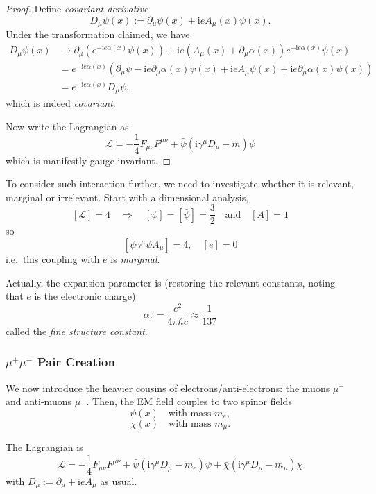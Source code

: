 \documentclass[a4paper,11pt]{article}
\begin{document}
	\begin{proof}
		Define \emph{covariant derivative}
		\[
			D_\mu \psi(x) := \partial_\mu \psi(x) + \mathrm{i} e A_\mu(x) \psi(x).
		\]
		Under the transformation claimed, we have
		\begin{align*}
			D_\mu \psi(x) &\to \partial_\mu \left( e ^{- \mathrm{i} e \alpha(x)} \psi(x) \right) + \mathrm{i} e \left( A_\mu(x) + \partial_\mu \alpha(x) \right) e ^{-\mathrm{i} e \alpha(x)} \psi(x)\\
			& = e ^{-\mathrm{i} e \alpha(x)}\left( \partial_\mu \psi - \mathrm{i} e \partial_\mu \alpha(x) \psi(x) + \mathrm{i} e A_\mu \psi(x) + \mathrm{i} e \partial_\mu \alpha(x)\psi(x) \right)\\
			& = e ^{-\mathrm{i} e \alpha(x)} D_\mu \psi.
		\end{align*}
		which is indeed \emph{covariant}.

		Now write the Lagrangian as 
		\[
			\mathcal{L} = - \frac{1}{4} F _{\mu \nu} F ^{\mu \nu} + \bar \psi(\mathrm{i} \gamma^\mu D_\mu - m)\psi
		\]
		which is manifestly gauge invariant.
	\end{proof}

	To consider such interaction further, we need to investigate whether it is relevant, marginal or irrelevant. Start with a dimensional analysis, 
	\[
		[\mathcal{L}] = 4 \quad \Rightarrow \quad [\psi] = [\bar \psi] = \frac{3}{2} \quad \text{and} \quad [A] = 1
	\]
	so 
	\[
		[\bar \psi \gamma^\mu \psi A_\mu] = 4, \quad [e] = 0
	\]
	i.e.\ this coupling with $e$ is \emph{marginal}.

	Actually, the expansion parameter is (restoring the relevant constants, noting that $e$ is the electronic charge)
	\[
		\alpha : = \frac{e^2}{4 \pi \hbar c} \approx \frac{1}{137}
	\]
	called the \emph{fine structure constant}.

	\subsubsection{$\mu^+ \mu^-$ Pair Creation}
	We now introduce the heavier cousins of electrons/anti-electrons: the muons $\mu^-$ and anti-muons $\mu^+$. Then, the EM field couples to two spinor fields
	\[
		\psi(x) \quad \text{with mass } m_e,
	\]
	\[
		\chi(x) \quad \text{with mass } m_\mu.
	\]
	
	The Lagrangian is 
	\[
		\mathcal{L} = - \frac{1}{4} F _{\mu \nu} F ^{\mu \nu} + \bar \psi (\mathrm{i} \gamma^\mu D_\mu - m_e) \psi + \bar \chi (\mathrm{i} \gamma^\mu D_\mu - m_\mu) \chi
	\]
	with $D_\mu := \partial_\mu + \mathrm{i} e A_\mu$ as usual.
	
\end{document}

